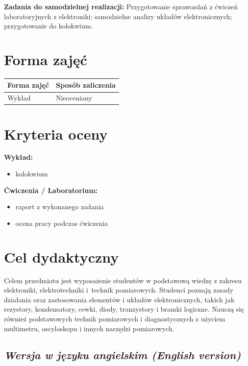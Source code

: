\documentclass[12pt, a4paper]{article}
\newcommand{\thdrule}{\noalign{\global\setlength{\extrarowheight}{0pt}}}
\newcommand{\thdend}{\noalign{\global\setlength{\extrarowheight}{3pt}}}
\begin{document}
\vspace{4pt}
\noindent\textbf{Zadania do samodzielnej realizacji:} Przygotowanie sprawozdań z ćwiczeń laboratoryjnych z elektroniki; samodzielne analizy układów elektronicznych; przygotowanie do kolokwium.

\section{Forma zajęć}

\begin{center}
{\scriptsize
\begin{tabular}{m{5cm}m{8cm}}
\thdrule\toprule
\rowcolor{pjatkRed} {\color{white}\textbf{Forma zajęć}} & {\color{white}\textbf{Sposób zaliczenia}} \\
\midrule\thdend
  \rowcolor{tableRowLight} Wykład & Nieoceniany \\
\bottomrule
\end{tabular}}
\end{center}

\section{Kryteria oceny}

\textbf{Wykład:}
\begin{itemize}
  \item kolokwium
\end{itemize}
\vspace{4pt}
\textbf{Ćwiczenia / Laboratorium:}
\begin{itemize}
  \item raport z wykonanego zadania
  \item ocena pracy podczas ćwiczenia
\end{itemize}


\section{Cel dydaktyczny}

Celem przedmiotu jest wyposażenie studentów w podstawową wiedzę z zakresu elektroniki, elektrotechniki i technik pomiarowych. Studenci poznają zasady działania oraz zastosowania elementów i układów elektronicznych, takich jak rezystory, kondensatory, cewki, diody, tranzystory i bramki logiczne. Nauczą się również podstawowych technik pomiarowych i diagnostycznych z użyciem multimetru, oscyloskopu i innych narzędzi pomiarowych.

\subsection*{\textit{Wersja w języku angielskim (English version)}}
\end{document}

